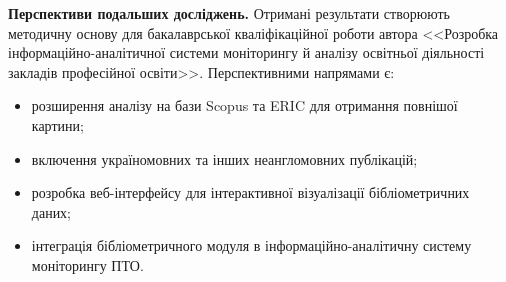 \textbf{Перспективи подальших досліджень.} Отримані результати створюють методичну основу для бакалаврської кваліфікаційної роботи автора <<Розробка інформаційно-аналітичної системи моніторингу й аналізу освітньої діяльності закладів професійної освіти>>. Перспективними напрямами є:
\begin{itemize}
    \item розширення аналізу на бази Scopus та ERIC для отримання повнішої картини;
    \item включення україномовних та інших неангломовних публікацій;
    \item розробка веб-інтерфейсу для інтерактивної візуалізації бібліометричних даних;
    \item інтеграція бібліометричного модуля в інформаційно-аналітичну систему моніторингу ПТО.
\end{itemize}
